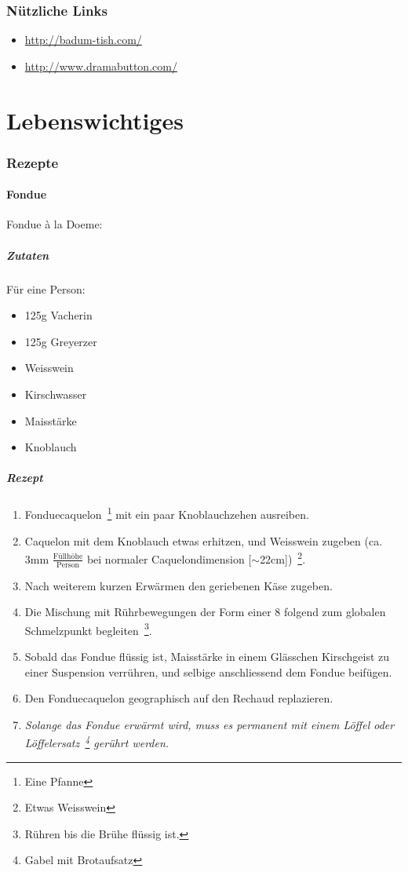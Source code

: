 \documentclass[oneside,12pt,a4paper]{scrartcl}
\newcommand{\linkitem}[1]{\item \url{#1}}
\begin{document}
\section{\glqq Nützliche \grqq Links}
\begin{itemize}
\linkitem{http://badum-tish.com/}
\linkitem{http://www.dramabutton.com/}
\end{itemize}

\part{Lebenswichtiges}
\section{Rezepte}
\subsection{Fondue}
Fondue à la Doeme:

\subsubsection{Zutaten}
Für eine Person:
\begin{itemize}
\item 125g Vacherin
\item 125g Greyerzer
\item Weisswein
\item Kirschwasser
\item Maisstärke
\item Knoblauch
\end{itemize}
\subsubsection{Rezept}

\begin{enumerate}
\item Fonduecaquelon~\footnote{Eine Pfanne} mit ein paar Knoblauchzehen ausreiben.
\item Caquelon mit dem Knoblauch etwas erhitzen, und Weisswein zugeben (ca. 3mm $\frac {\mbox{Füllhöhe}} {\mbox{Person}}$ bei normaler Caquelondimension [$\sim$22cm])~\footnote{Etwas Weisswein}.
\item Nach weiterem kurzen Erwärmen den geriebenen Käse zugeben.
\item Die Mischung mit Rührbewegungen der Form einer 8 folgend zum globalen Schmelzpunkt begleiten~\footnote{Rühren bis die Brühe flüssig ist.}.
\item Sobald das Fondue flüssig ist, Maisstärke in einem Glässchen Kirschgeist zu einer Suspension verrühren, und selbige anschliessend dem Fondue beifügen.
\item Den Fonduecaquelon geographisch auf den Rechaud replazieren.
\item \emph{Solange das Fondue erwärmt wird, muss es permanent mit einem Löffel oder Löffelersatz~\footnote{Gabel mit Brotaufsatz} gerührt werden.} 
\end{enumerate}
\end{document}
